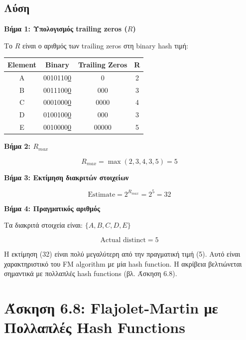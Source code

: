 \subsection*{Λύση}

\textbf{Βήμα 1: Υπολογισμός trailing zeros ($R$)}

Το $R$ είναι ο αριθμός των trailing zeros στη binary hash τιμή:

\begin{center}
\begin{tabular}{cccc}
\toprule
\textbf{Element} & \textbf{Binary} & \textbf{Trailing Zeros} & \textbf{R} \\
\midrule
A & 0010110\underline{0} & 0 & 2 \\
B & 0011100\underline{0} & 000 & 3 \\
C & 0001000\underline{0} & 0000 & 4 \\
D & 0100100\underline{0} & 000 & 3 \\
E & 0010000\underline{0} & 00000 & 5 \\
\bottomrule
\end{tabular}
\end{center}

\textbf{Βήμα 2: $R_{max}$}

$$R_{max} = \max(2, 3, 4, 3, 5) = 5$$

\textbf{Βήμα 3: Εκτίμηση διακριτών στοιχείων}

$$\text{Estimate} = 2^{R_{max}} = 2^5 = 32$$

\textbf{Βήμα 4: Πραγματικός αριθμός}

Τα διακριτά στοιχεία είναι: $\{A, B, C, D, E\}$

$$\text{Actual distinct} = 5$$

\begin{warningbox}
Η εκτίμηση (32) είναι πολύ μεγαλύτερη από την πραγματική τιμή (5).
Αυτό είναι χαρακτηριστικό του FM algorithm με μία hash function.
Η ακρίβεια βελτιώνεται σημαντικά με πολλαπλές hash functions (βλ. Άσκηση 6.8).
\end{warningbox}

\section{Άσκηση 6.8: Flajolet-Martin με Πολλαπλές Hash Functions}

